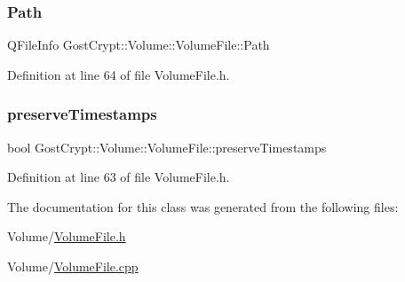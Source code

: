\subsubsection{\texorpdfstring{Path}{Path}}
{\footnotesize\ttfamily Q\+File\+Info Gost\+Crypt\+::\+Volume\+::\+Volume\+File\+::\+Path\hspace{0.3cm}{\ttfamily [protected]}}



Definition at line 64 of file Volume\+File.\+h.

\mbox{\label{class_gost_crypt_1_1_volume_1_1_volume_file_a8c6dc4712abe9ba03348af5938d200cb}} 
\subsubsection{\texorpdfstring{preserve\+Timestamps}{preserveTimestamps}}
{\footnotesize\ttfamily bool Gost\+Crypt\+::\+Volume\+::\+Volume\+File\+::preserve\+Timestamps\hspace{0.3cm}{\ttfamily [protected]}}



Definition at line 63 of file Volume\+File.\+h.



The documentation for this class was generated from the following files\+:\begin{DoxyCompactItemize}
\item 
Volume/\hyperlink{_volume_file_8h}{Volume\+File.\+h}\item 
Volume/\hyperlink{_volume_file_8cpp}{Volume\+File.\+cpp}\end{DoxyCompactItemize}
